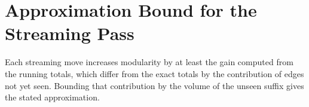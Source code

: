 \chapter{Approximation Bound for the Streaming Pass}
\label{app:a}

Each streaming move increases modularity by at least the gain computed from the running
totals, which differ from the exact totals by the contribution of edges not yet seen. Bounding
that contribution by the volume of the unseen suffix gives the stated approximation.
